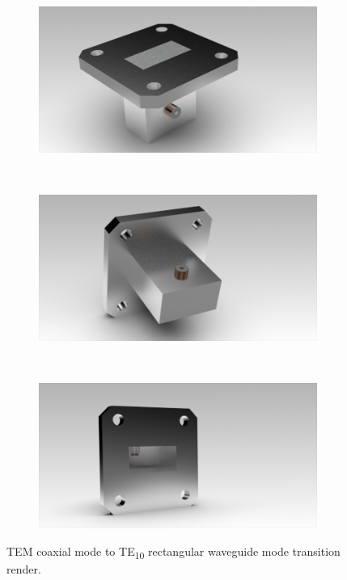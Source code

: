 \documentclass[english,twoside]{article}
\begin{document}
	
		\begin{figure}[H]
			\centering			
			\begin{subfigure}[b]{0.48\textwidth}
				\includegraphics[width=\textwidth]{renders/coaxToWaveguide}
			\end{subfigure}
			~
			\begin{subfigure}[b]{0.48\textwidth}
				\includegraphics[width=\textwidth]{renders/coaxToWaveguide-2}
			\end{subfigure}
			\vspace{10pt}\newline
			~
			\begin{subfigure}[b]{0.48\textwidth}
				\includegraphics[width=\textwidth]{renders/coaxToWaveguide-3}
			\end{subfigure}			
			\caption{TEM coaxial mode to TE\textsubscript{10} rectangular waveguide mode transition render.}
		\end{figure}
	
\end{document}
